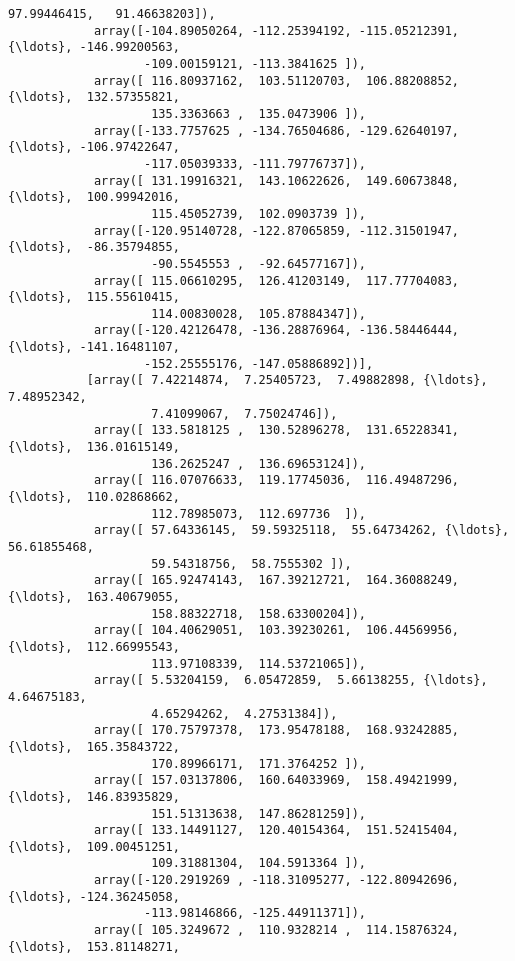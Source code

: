 \documentclass[11pt]{article}
\begin{document}
\begin{Verbatim}[commandchars=\\\{\}]
                     97.99446415,   91.46638203]),
            array([-104.89050264, -112.25394192, -115.05212391, {\ldots}, -146.99200563,
                   -109.00159121, -113.3841625 ]),
            array([ 116.80937162,  103.51120703,  106.88208852, {\ldots},  132.57355821,
                    135.3363663 ,  135.0473906 ]),
            array([-133.7757625 , -134.76504686, -129.62640197, {\ldots}, -106.97422647,
                   -117.05039333, -111.79776737]),
            array([ 131.19916321,  143.10622626,  149.60673848, {\ldots},  100.99942016,
                    115.45052739,  102.0903739 ]),
            array([-120.95140728, -122.87065859, -112.31501947, {\ldots},  -86.35794855,
                    -90.5545553 ,  -92.64577167]),
            array([ 115.06610295,  126.41203149,  117.77704083, {\ldots},  115.55610415,
                    114.00830028,  105.87884347]),
            array([-120.42126478, -136.28876964, -136.58446444, {\ldots}, -141.16481107,
                   -152.25555176, -147.05886892])],
           [array([ 7.42214874,  7.25405723,  7.49882898, {\ldots},  7.48952342,
                    7.41099067,  7.75024746]),
            array([ 133.5818125 ,  130.52896278,  131.65228341, {\ldots},  136.01615149,
                    136.2625247 ,  136.69653124]),
            array([ 116.07076633,  119.17745036,  116.49487296, {\ldots},  110.02868662,
                    112.78985073,  112.697736  ]),
            array([ 57.64336145,  59.59325118,  55.64734262, {\ldots},  56.61855468,
                    59.54318756,  58.7555302 ]),
            array([ 165.92474143,  167.39212721,  164.36088249, {\ldots},  163.40679055,
                    158.88322718,  158.63300204]),
            array([ 104.40629051,  103.39230261,  106.44569956, {\ldots},  112.66995543,
                    113.97108339,  114.53721065]),
            array([ 5.53204159,  6.05472859,  5.66138255, {\ldots},  4.64675183,
                    4.65294262,  4.27531384]),
            array([ 170.75797378,  173.95478188,  168.93242885, {\ldots},  165.35843722,
                    170.89966171,  171.3764252 ]),
            array([ 157.03137806,  160.64033969,  158.49421999, {\ldots},  146.83935829,
                    151.51313638,  147.86281259]),
            array([ 133.14491127,  120.40154364,  151.52415404, {\ldots},  109.00451251,
                    109.31881304,  104.5913364 ]),
            array([-120.2919269 , -118.31095277, -122.80942696, {\ldots}, -124.36245058,
                   -113.98146866, -125.44911371]),
            array([ 105.3249672 ,  110.9328214 ,  114.15876324, {\ldots},  153.81148271,

\end{Verbatim}
\end{document}
